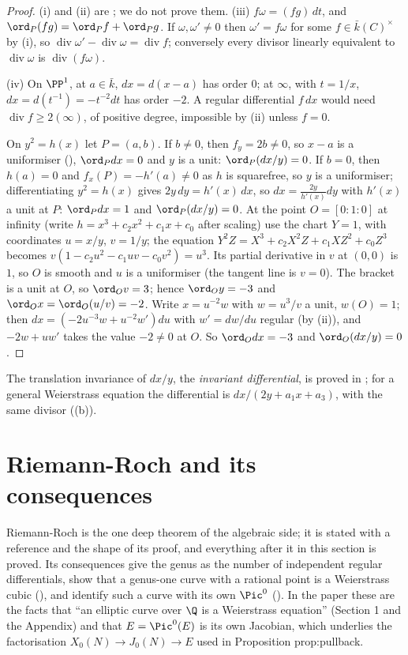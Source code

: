 \begin{proof}
(i) and (ii) are \cite[Chapter II, Propositions 4.2 and 4.3]{SilvermanAEC}; we do not prove them. (iii) $f\omega=(fg)\,dt$, and $\ord_P(fg)=\ord_Pf+\ord_Pg$.
If $\omega,\omega'\ne0$ then $\omega'=f\omega$ for some $f\in\bar k(C)^\times$ by (i), so $\operatorname{div}\omega'-\operatorname{div}\omega=\operatorname{div}f$; conversely every divisor
linearly equivalent to $\operatorname{div}\omega$ is $\operatorname{div}(f\omega)$.

(iv) On $\PP^1$, at $a\in\bar k$, $dx=d(x-a)$ has order $0$; at $\infty$, with $t=1/x$, $dx=d(t^{-1})=-t^{-2}dt$ has order $-2$. A regular differential
$f\,dx$ would need $\operatorname{div}f\ge2(\infty)$, of positive degree, impossible by (ii) unless $f=0$.

On $y^2=h(x)$ let $P=(a,b)$. If $b\ne0$, then $f_y=2b\ne0$, so $x-a$ is a uniformiser (), $\ord_Pdx=0$ and $y$ is a unit:
$\ord_P(dx/y)=0$. If $b=0$, then $h(a)=0$ and $f_x(P)=-h'(a)\ne0$ as $h$ is squarefree, so $y$ is a uniformiser; differentiating $y^2=h(x)$ gives
$2y\,dy=h'(x)\,dx$, so $dx=\frac{2y}{h'(x)}dy$ with $h'(x)$ a unit at $P$: $\ord_Pdx=1$ and $\ord_P(dx/y)=0$. At the point $O=[0:1:0]$ at infinity
(write $h=x^3+c_2x^2+c_1x+c_0$ after scaling) use the chart $Y=1$, with coordinates $u=x/y$, $v=1/y$; the equation $Y^2Z=X^3+c_2X^2Z+c_1XZ^2+c_0Z^3$
becomes $v(1-c_2u^2-c_1uv-c_0v^2)=u^3$. Its partial derivative in $v$ at $(0,0)$ is $1$, so $O$ is smooth and $u$ is a uniformiser (the tangent line
is $v=0$). The bracket is a unit at $O$, so $\ord_Ov=3$; hence $\ord_Oy=-3$ and $\ord_Ox=\ord_O(u/v)=-2$. Write $x=u^{-2}w$ with $w=u^3/v$ a unit,
$w(O)=1$; then $dx=(-2u^{-3}w+u^{-2}w')du$ with $w'=dw/du$ regular (by (ii)), and $-2w+uw'$ takes the value $-2\ne0$ at $O$. So $\ord_Odx=-3$ and
$\ord_O(dx/y)=0$.
\end{proof}

The translation invariance of $dx/y$, the \emph{invariant differential}, is proved in ; for a general Weierstrass equation the
differential is $dx/(2y+a_1x+a_3)$, with the same divisor ((b)).

\section{Riemann-Roch and its consequences}\label{sec:curves:riemann-roch}

Riemann-Roch is the one deep theorem of the algebraic side; it is stated with a reference and the shape of its proof, and everything after
it in this section is proved. Its consequences give the genus as the number of independent regular differentials, show that a genus-one curve
with a rational point is a Weierstrass cubic (), and identify such a curve with its own $\Pic^0$
(). In the paper these are the facts that ``an elliptic curve over $\Q$ is a Weierstrass equation'' (Section 1 and
the Appendix) and that $E=\Pic^0(E)$ is its own Jacobian, which underlies the factorisation $X_0(N)\to J_0(N)\to E$ used in Proposition prop:pullback.

